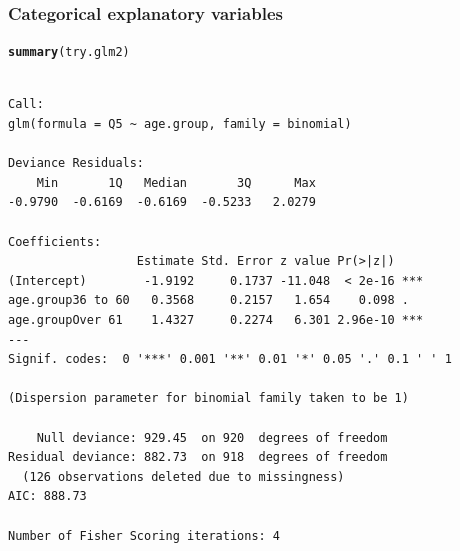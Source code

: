 \documentclass{beamer}\usepackage[]{graphicx}\usepackage[]{color}
\makeatletter
\newcommand{\hlstd}[1]{\textcolor[rgb]{0.345,0.345,0.345}{#1}}%
\newcommand{\hlkwd}[1]{\textcolor[rgb]{0.737,0.353,0.396}{\textbf{#1}}}%
\newenvironment{kframe}{%
 \def\at@end@of@kframe{}%
 \ifinner\ifhmode%
  \def\at@end@of@kframe{\end{minipage}}%
  \begin{minipage}{\columnwidth}%
 \fi\fi%
 \def\FrameCommand##1{\hskip\@totalleftmargin \hskip-\fboxsep
 \colorbox{shadecolor}{##1}\hskip-\fboxsep
     \hskip-\linewidth \hskip-\@totalleftmargin \hskip\columnwidth}%
 \MakeFramed {\advance\hsize-\width
   \@totalleftmargin\z@ \linewidth\hsize
   \@setminipage}}%
 {\par\unskip\endMakeFramed%
 \at@end@of@kframe}
\newenvironment{knitrout}{}{} %
\makeatother
\begin{document}
\begin{frame}[fragile]
\frametitle{Categorical explanatory variables}
\begin{scriptsize}
\begin{knitrout}
\color{fgcolor}\begin{kframe}
\begin{alltt}
\hlkwd{summary}\hlstd{(try.glm2)}
\end{alltt}
\begin{verbatim}

Call:
glm(formula = Q5 ~ age.group, family = binomial)

Deviance Residuals: 
    Min       1Q   Median       3Q      Max  
-0.9790  -0.6169  -0.6169  -0.5233   2.0279  

Coefficients:
                  Estimate Std. Error z value Pr(>|z|)    
(Intercept)        -1.9192     0.1737 -11.048  < 2e-16 ***
age.group36 to 60   0.3568     0.2157   1.654    0.098 .  
age.groupOver 61    1.4327     0.2274   6.301 2.96e-10 ***
---
Signif. codes:  0 '***' 0.001 '**' 0.01 '*' 0.05 '.' 0.1 ' ' 1

(Dispersion parameter for binomial family taken to be 1)

    Null deviance: 929.45  on 920  degrees of freedom
Residual deviance: 882.73  on 918  degrees of freedom
  (126 observations deleted due to missingness)
AIC: 888.73

Number of Fisher Scoring iterations: 4
\end{verbatim}
\end{kframe}
\end{knitrout}
\end{scriptsize}
\end{frame}
\end{document}
